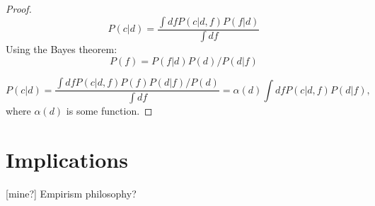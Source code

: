 \documentclass[a4paper]{article}
\begin{document}
\begin{proof}
  \begin{equation}
    P(c|d) = \frac{\int df P(c|d,f) P(f|d)}{\int df}
  \end{equation}
  Using the Bayes theorem:
  \begin{equation}
    P(f) =  P(f|d) P(d) / P(d|f)
  \end{equation}

  \begin{equation}
    P(c|d) = \frac{\int df P(c|d,f) P(f) P(d|f) / P(d)}{\int df} = \alpha(d)
    \int df P(c|d,f) P(d|f),
  \end{equation}
  where $\alpha(d)$ is some function.
\end{proof}

\section{Implications}
[mine?] Empirism philosophy?
\end{document}
